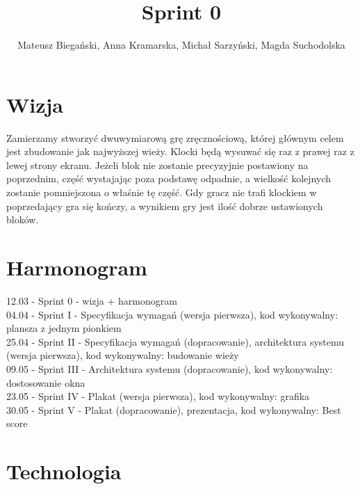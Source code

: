 \documentclass{article}
\begin{document}
\title{Sprint 0}

\author{Mateusz Biegański, Anna Kramarska, Michał Sarzyński, Magda Suchodolska}
\maketitle

\section{Wizja}

Zamierzamy stworzyć dwuwymiarową grę zręcznościową, której głównym celem jest zbudowanie jak najwyższej wieży.
Klocki będą wysuwać się raz z prawej raz z lewej strony ekranu.
Jeżeli blok nie zostanie precyzyjnie postawiony na poprzednim, część wystajając poza podstawę odpadnie, a wielkość kolejnych zostanie pomniejszona o właśnie tę część.
Gdy gracz nie trafi klockiem w poprzedający gra się kończy, a wynikiem gry jest ilość dobrze ustawionych bloków.

\section{Harmonogram}

12.03 - Sprint 0 - wizja + harmonogram
\\04.04 - Sprint I - Specyfikacja wymagań (wersja pierwsza), kod wykonywalny: plansza z jednym pionkiem
\\25.04 - Sprint II - Specyfikacja wymagań (dopracowanie), architektura systemu (wersja pierwsza), kod wykonywalny: budowanie wieży
\\09.05 - Sprint III - Architektura systemu (dopracowanie), kod wykonywalny: dostosowanie okna
\\23.05 - Sprint IV - Plakat (wersja pierwsza), kod wykonywalny: grafika
\\30.05 - Sprint V - Plakat (dopracowanie), prezentacja, kod wykonywalny: Best score

\section{Technologia}
\end{document}

